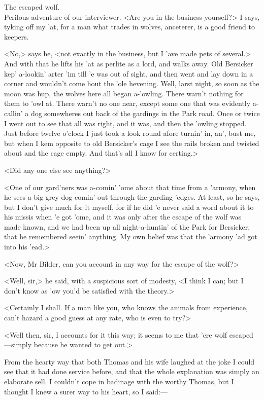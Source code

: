 \begin{newspaper}{The escaped wolf.\\Perilous adventure of our interviewer.}
<Are you in the business yourself?> I says, tyking off my 'at, for a man what trades in wolves, anceterer, is a good friend to keepers.

<No,> says he, <not exactly in the business, but I 'ave made pets of several.> And with that he lifts his 'at as perlite as a lord, and walks away. Old Bersicker kep' a-lookin' arter 'im till 'e was out of sight, and then went and lay down in a corner and wouldn't come hout the 'ole hevening. Well, larst night, so soon as the moon was hup, the wolves here all began a-'owling. There warn't nothing for them to 'owl at. There warn't no one near, except some one that was evidently a-callin' a dog somewheres out back of the gardings in the Park road. Once or twice I went out to see that all was right, and it was, and then the 'owling stopped. Just before twelve o'clock I just took a look round afore turnin' in, an', bust me, but when I kem opposite to old Bersicker's cage I see the rails broken and twisted about and the cage empty. And that's all I know for certing.>

<Did any one else see anything?>

<One of our gard'ners was a-comin' 'ome about that time from a 'armony, when he sees a big grey dog comin' out through the garding 'edges. At least, so he says, but I don't give much for it myself, for if he did 'e never said a word about it to his missis when 'e got 'ome, and it was only after the escape of the wolf was made known, and we had been up all night-a-huntin' of the Park for Bersicker, that he remembered seein' anything. My own belief was that the 'armony 'ad got into his 'ead.>

<Now, Mr Bilder, can you account in any way for the escape of the wolf?>

<Well, sir,> he said, with a suspicious sort of modesty, <I think I can; but I don't know as 'ow you'd be satisfied with the theory.>

<Certainly I shall. If a man like you, who knows the animals from experience, can't hazard a good guess at any rate, who is even to try?>

<Well then, sir, I accounts for it this way; it seems to me that 'ere wolf escaped—simply because he wanted to get out.>

From the hearty way that both Thomas and his wife laughed at the joke I could see that it had done service before, and that the whole explanation was simply an elaborate sell. I couldn't cope in badinage with the worthy Thomas, but I thought I knew a surer way to his heart, so I said:—


\end{newspaper}
